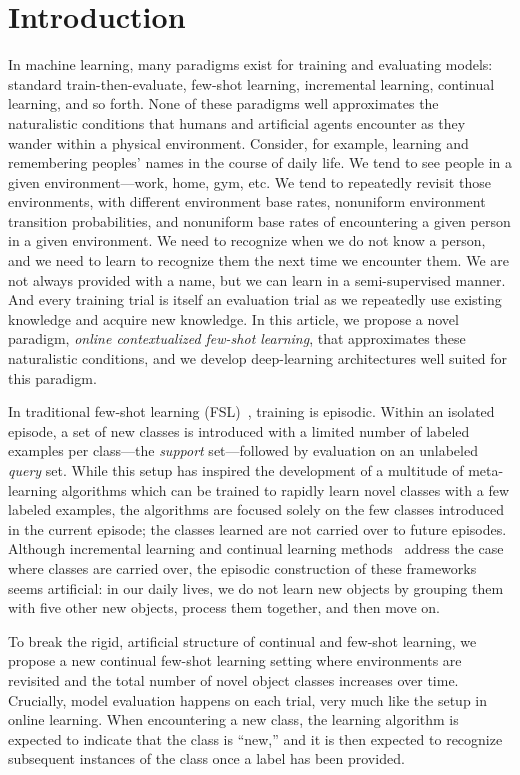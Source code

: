 \section{Introduction}
\vspace{-0.1in}
In machine learning, many paradigms exist for training and evaluating models: standard
train-then-evaluate, few-shot learning, incremental learning, continual learning, and so forth. None
of these paradigms well approximates the naturalistic conditions that humans and artificial agents
encounter as they wander within a physical environment. Consider, for example, learning and
remembering peoples' names in the course of daily life. We tend to see people in a given
environment---work, home, gym, etc. We tend to repeatedly revisit those environments, with different
environment base rates, nonuniform environment transition probabilities, and nonuniform base rates
of encountering a given person in a given environment. We need to recognize when we do not know a
person, and we need to learn to recognize them the next time we encounter them. We are not always
provided with a name, but we can learn in a semi-supervised manner. And every training trial is
itself an evaluation trial as we repeatedly use existing knowledge and acquire new knowledge. In
this article, we propose a novel paradigm, \emph{online contextualized few-shot learning}, that
approximates these naturalistic conditions, and we develop deep-learning architectures well suited
for this paradigm.

In traditional few-shot learning (FSL)~\citep{omniglot,matchingnet}, training is episodic. Within an
isolated episode, a set of new classes is introduced with a limited number of labeled examples per
class---the \textit{support}  set---followed by evaluation on an unlabeled \textit{query} set. While
this setup has inspired the development of a multitude of meta-learning algorithms which can be
trained to rapidly learn novel classes with a few labeled examples, the algorithms are focused
solely on the few classes introduced in the current episode; the classes learned are not carried
over to future episodes. Although incremental learning and continual learning
methods~\citep{icarl,rebalance} address the case where classes are carried over, the episodic
construction of these frameworks seems artificial: in our daily lives, we do not learn new objects
by grouping them with five other new objects, process them together, and then move on.

To break the rigid, artificial structure of continual and few-shot learning, we propose a new
continual few-shot learning setting where environments are revisited and the total number of novel
object classes increases over time. Crucially, model evaluation happens on each trial, very much
like the setup in online learning. When encountering a new class, the learning algorithm is expected
to indicate that the class is ``new,'' and it is then expected to recognize subsequent instances of
the class once a label has been provided.

